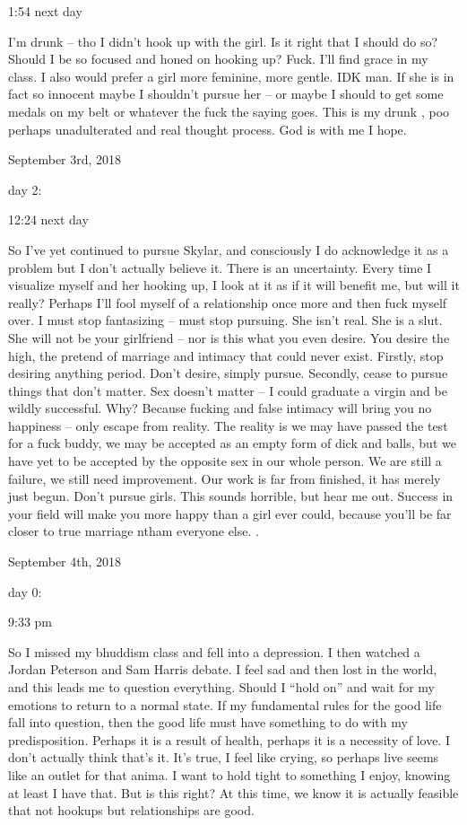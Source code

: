 1:54 next day

I'm drunk -- tho I didn't hook up with the girl. Is it right that I
should do so? Should I be so focused and honed on hooking up? Fuck. I'll
find grace in my class. I also would prefer a girl more feminine, more
gentle. IDK man. If she is in fact so innocent maybe I shouldn't pursue
her -- or maybe I should to get some medals on my belt or whatever the
fuck the saying goes. This is my drunk , poo perhaps unadulterated and
real thought process. God is with me I hope.

\bigskip
\bigskip
September 3rd, 2018

day 2:

12:24 next day

So I've yet continued to pursue Skylar, and consciously I do acknowledge
it as a problem but I don't actually believe it. There is an
uncertainty. Every time I visualize myself and her hooking up, I look at
it as if it will benefit me, but will it really? Perhaps I'll fool
myself of a relationship once more and then fuck myself over. I must
stop fantasizing -- must stop pursuing. She isn't real. She is a slut.
She will not be your girlfriend -- nor is this what you even desire. You
desire the high, the pretend of marriage and intimacy that could never
exist. Firstly, stop desiring anything period. Don't desire, simply
pursue. Secondly, cease to pursue things that don't matter. Sex doesn't
matter -- I could graduate a virgin and be wildly successful. Why?
Because fucking and false intimacy will bring you no happiness -- only
escape from reality. The reality is we may have passed the test for a
fuck buddy, we may be accepted as an empty form of dick and balls, but
we have yet to be accepted by the opposite sex in our whole person. We
are still a failure, we still need improvement. Our work is far from
finished, it has merely just begun. Don't pursue girls. This sounds
horrible, but hear me out. Success in your field will make you more
happy than a girl ever could, because you'll be far closer to true
marriage ntham everyone else. .

\bigskip
\bigskip
September 4th, 2018

day 0:

9:33 pm

So I missed my bhuddism class and fell into a depression. I then watched
a Jordan Peterson and Sam Harris debate. I feel sad and then lost in the
world, and this leads me to question everything. Should I ``hold on''
and wait for my emotions to return to a normal state. If my fundamental
rules for the good life fall into question, then the good life must have
something to do with my predisposition. Perhaps it is a result of
health, perhaps it is a necessity of love. I don't actually think that's
it. It's true, I feel like crying, so perhaps live seems like an outlet
for that anima. I want to hold tight to something I enjoy, knowing at
least I have that. But is this right? At this time, we know it is
actually feasible that not hookups but relationships are good.

